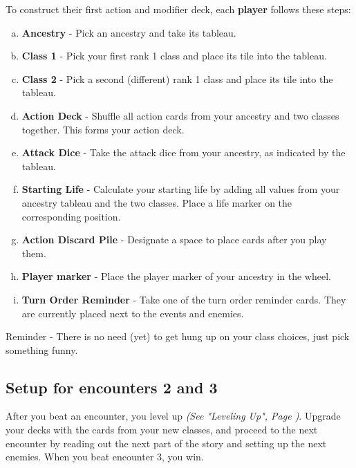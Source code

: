 \begin{minipage}[t][6cm][t]{1\textwidth}
	To construct their first action and modifier deck, each \textbf{player} follows these steps:
	\begin{enumerate}[a)]	
		\item \textbf{Ancestry} - Pick an ancestry and take its tableau.
		\item \textbf{Class 1} - Pick your first rank 1 class and place its tile into the tableau.
		\item \textbf{Class 2} - Pick a second (different) rank 1 class and place its tile into the tableau.
		\item \textbf{Action Deck} - Shuffle all action cards from your ancestry and two classes together. This forms your action deck.
		\item \textbf{Attack Dice} - Take the attack dice from your ancestry, as indicated by the tableau.
		\item \textbf{Starting Life} - Calculate your starting life by adding all values from your ancestry tableau and the two classes. Place a life marker on the corresponding position.
		\item \textbf{Action Discard Pile} - Designate a space to place cards after you play them.
		\item \textbf{Player marker} - Place the player marker of your ancestry in the wheel.
		\item \textbf{Turn Order Reminder} - Take one of the turn order reminder cards. They are currently placed next to the events and enemies.
	\end{enumerate}
\end{minipage}	

\begin{tcolorbox}[colframe=blue, colback=white]
	Reminder -	There is no need (yet) to get hung up on your class choices, just pick something funny.
\end{tcolorbox}







	
	
	
\subsection*{Setup for encounters 2 and 3}
After you beat an encounter, you level up \textit{(See "Leveling Up", Page \pageref{Section_Leveling})}.
Upgrade your decks with the cards from your new classes, and proceed to the next encounter by reading out the next part of the story and setting up the next enemies.
When you beat encounter 3, you win.


